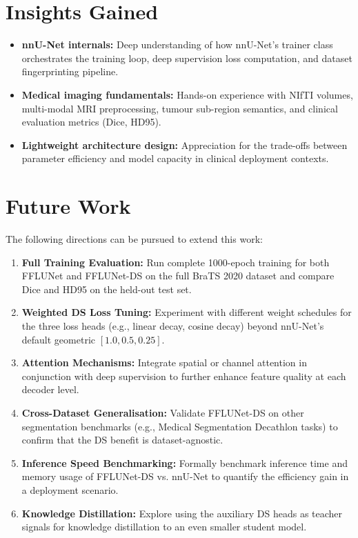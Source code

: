 \documentclass[12pt,a4paper]{report}
\begin{document}
\section{Insights Gained}

\begin{itemize}[leftmargin=*]
    \item \textbf{nnU-Net internals:} Deep understanding of how nnU-Net's trainer class orchestrates the training loop, deep supervision loss computation, and dataset fingerprinting pipeline.
    \item \textbf{Medical imaging fundamentals:} Hands-on experience with NIfTI volumes, multi-modal MRI preprocessing, tumour sub-region semantics, and clinical evaluation metrics (Dice, HD95).
    \item \textbf{Lightweight architecture design:} Appreciation for the trade-offs between parameter efficiency and model capacity in clinical deployment contexts.
\end{itemize}

\section{Future Work}

The following directions can be pursued to extend this work:

\begin{enumerate}[leftmargin=*]
    \item \textbf{Full Training Evaluation:} Run complete 1000-epoch training for both FFLUNet and FFLUNet-DS on the full BraTS 2020 dataset and compare Dice and HD95 on the held-out test set.
    \item \textbf{Weighted DS Loss Tuning:} Experiment with different weight schedules for the three loss heads (e.g., linear decay, cosine decay) beyond nnU-Net's default geometric $[1.0, 0.5, 0.25]$.
    \item \textbf{Attention Mechanisms:} Integrate spatial or channel attention in conjunction with deep supervision to further enhance feature quality at each decoder level.
    \item \textbf{Cross-Dataset Generalisation:} Validate FFLUNet-DS on other segmentation benchmarks (e.g., Medical Segmentation Decathlon tasks) to confirm that the DS benefit is dataset-agnostic.
    \item \textbf{Inference Speed Benchmarking:} Formally benchmark inference time and memory usage of FFLUNet-DS vs. nnU-Net to quantify the efficiency gain in a deployment scenario.
    \item \textbf{Knowledge Distillation:} Explore using the auxiliary DS heads as teacher signals for knowledge distillation to an even smaller student model.
\end{enumerate}
\end{document}
